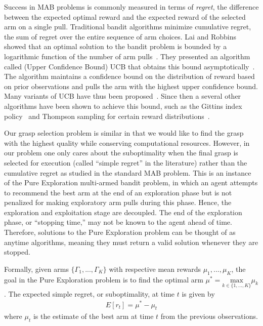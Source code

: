 \documentclass[journal,transmag]{IEEEtran}%
\begin{document}
Success in MAB problems is commonly measured in terms of {\it regret}, the difference between the expected optimal reward and the expected reward of the selected arm on a single pull.
Traditional bandit algorithms minimize cumulative regret, the sum of regret over the entire sequence of arm choices.
Lai and Robbins showed that an optimal solution to the bandit problem is bounded by a logarithmic function of the number of arm pulls~\cite{lai1985asymptotically}.
They presented an algorithm called (Upper Confidence Bound) UCB that obtains this bound asymptotically~\cite{lai1985asymptotically}.
The algorithm maintains a confidence bound on the distribution of reward based on prior observations and pulls the arm with the highest upper confidence bound.
Many variants of UCB have thus been proposed~\cite{}. 
Since then a several other algorithms have been shown to achieve this bound, such as the Gittins index policy~\cite{} and Thompson sampling for certain reward distributions~\cite{}.

Our grasp selection problem is similar in that we would like to find the grasp with the highest quality while conserving computational resources.
However, in our problem one only cares about the suboptimality when the final grasp is selected for execution (called ``simple regret'' in the literature) rather than the cumulative regret as studied in the standard MAB problem.
This is an instance of the Pure Exploration multi-armed bandit problem\cite{bubeck2009pure}, in which an agent attempts to recommend the best arm at the end of an exploration phase but is not penalized for making exploratory arm pulls during this phase.
Hence, the exploration and exploitation stage are decoupled. 
The end of the exploration phase, or ``stopping time,'' may not be known to the agent ahead of time.
Therefore, solutions to the Pure Exploration problem can be thought of as anytime algorithms, meaning they must return a valid solution whenever they are stopped.

Formally, given arms $\lbrace \Gamma_1, ..., \Gamma_K \rbrace$ with respective mean rewards $\mu_1, ..., \mu_K$, the goal in the Pure Exploration problem is to find the optimal arm $\mu^* = \underset{k\in\lbrace 1, ..., K \rbrace}{\mbox{max}} \mu_k$.
The expected simple regret, or suboptimality, at time $t$ is given by
\vspace{-2ex}
\begin{align}\label{eq:simple_regret}
E[r_t] = \mu^* - \mu_t
\end{align}
\noindent where $\mu_t$ is the estimate of the best arm at time $t$ from the previous observations.
\end{document}

